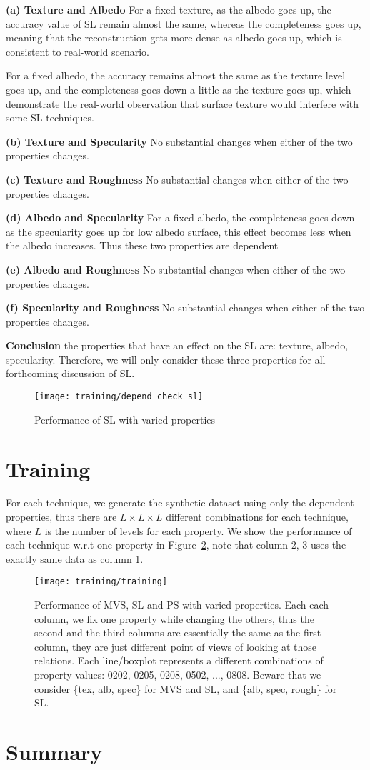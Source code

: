 \textbf{(a) Texture and Albedo} 
For a fixed texture, as the albedo goes up, the accuracy value of SL remain almost the same, whereas the completeness goes up, meaning that the reconstruction gets more dense as albedo goes up, which is consistent to real-world scenario.

For a fixed albedo, the accuracy remains almost the same as the texture level goes up, and the completeness goes down a little as the texture goes up, which demonstrate the real-world observation that surface texture would interfere with some SL techniques.

\textbf{(b) Texture and Specularity} 
No substantial changes when either of the two properties changes.

\textbf{(c) Texture and Roughness} 
No substantial changes when either of the two properties changes.

\textbf{(d) Albedo and Specularity} 
For a fixed albedo, the completeness goes down as the specularity goes up for low albedo surface, this effect becomes less when the albedo increases. Thus these two properties are dependent

\textbf{(e) Albedo and Roughness} 
No substantial changes when either of the two properties changes.

\textbf{(f) Specularity and Roughness} 
No substantial changes when either of the two properties changes.

\textbf{Conclusion} the properties that have an effect on the SL are: texture, albedo, specularity. Therefore, we will only consider these three properties for all forthcoming discussion of SL.

\begin{figure}[h!]
\texttt{[image: training/depend\_check\_sl]}
\caption{Performance of SL with varied properties}
\label{fig:depend_check_sl}
\end{figure}

\section{Training}
For each technique, we generate the synthetic dataset using only the dependent properties, thus there are $L\times L\times L$ different combinations for each technique, where $L$ is the number of levels for each property. We show the performance of each technique w.r.t one property in Figure~\ref{fig:training}, note that column 2, 3 uses the exactly same data as column 1.

\begin{figure}[h!]
\texttt{[image: training/training]}
\caption{Performance of MVS, SL and PS with varied properties. Each each column, we fix one property while changing the others, thus the second and the third columns are essentially the same as the first column, they are just different point of views of looking at those relations. Each line/boxplot represents a different combinations of property values: 0202, 0205, 0208, 0502, ..., 0808. Beware that we consider \{tex, alb, spec\} for MVS and SL, and \{alb, spec, rough\} for SL.}
\label{fig:training}
\end{figure}

\section{Summary}

